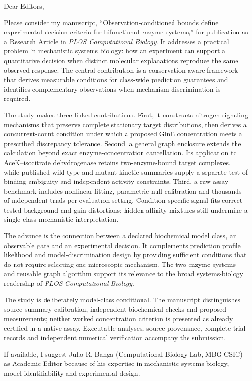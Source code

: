 \documentclass[11pt,a4paper]{article}
\begin{document}
Dear Editors,

Please consider my manuscript, ``Observation-conditioned bounds define experimental decision criteria for bifunctional enzyme systems,'' for publication as a Research Article in \textit{PLOS Computational Biology}. It addresses a practical problem in mechanistic systems biology: how an experiment can support a quantitative decision when distinct molecular explanations reproduce the same observed response. The central contribution is a conservation-aware framework that derives measurable conditions for class-wide prediction guarantees and identifies complementary observations when mechanism discrimination is required.

The study makes three linked contributions. First, it constructs nitrogen-signaling mechanisms that preserve complete stationary target distributions, then derives a concurrent-count condition under which a proposed GlnE concentration meets a prescribed discrepancy tolerance. Second, a general graph enclosure extends the calculation beyond exact enzyme-concentration cancellation. Its application to AceK--isocitrate dehydrogenase retains two-enzyme-bound target complexes, while published wild-type and mutant kinetic summaries supply a separate test of binding ambiguity and independent-activity constraints. Third, a raw-assay benchmark includes nonlinear fitting, parametric null calibration and thousands of independent trials per evaluation setting. Condition-specific signal fits correct tested background and gain distortions; hidden affinity mixtures still undermine a single-class mechanistic interpretation.

The advance is the connection between a declared biochemical model class, an observable gate and an experimental decision. It complements prediction profile likelihood and model-discrimination design by providing sufficient conditions that do not require selecting one microscopic mechanism. The two enzyme systems and reusable graph algorithm support its relevance to the broad systems-biology readership of \textit{PLOS Computational Biology}.

The study is deliberately model-class conditional. The manuscript distinguishes source-summary calibration, independent biochemical checks and proposed measurements; neither worked concentration criterion is presented as already certified in a native assay. Executable analyses, source provenance, complete trial records and independent numerical verification accompany the submission.

If available, I suggest Julio R. Banga (Computational Biology Lab, MBG-CSIC) as Academic Editor because of his expertise in mechanistic systems biology, model identifiability and experimental design.
\end{document}
